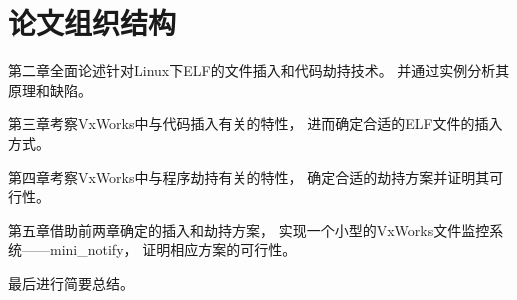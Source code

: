 \section{论文组织结构}

第二章全面论述针对Linux下ELF的文件插入和代码劫持技术。
并通过实例分析其原理和缺陷。

第三章考察VxWorks中与代码插入有关的特性，
进而确定合适的ELF文件的插入方式。

第四章考察VxWorks中与程序劫持有关的特性，
确定合适的劫持方案并证明其可行性。

第五章借助前两章确定的插入和劫持方案，
实现一个小型的VxWorks文件监控系统——mini\_notify，
证明相应方案的可行性。

最后进行简要总结。

